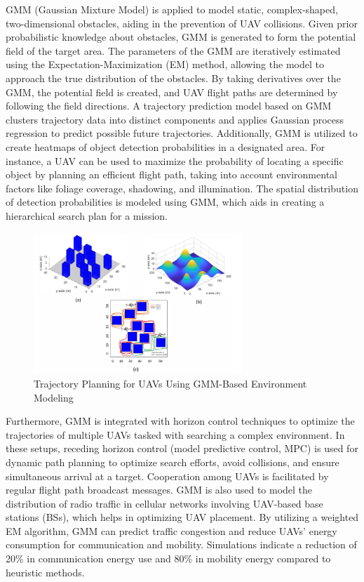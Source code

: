 GMM (Gaussian Mixture Model) is applied to model static, complex-shaped, two-dimensional obstacles, aiding in the prevention of UAV collisions. Given prior probabilistic knowledge about obstacles, GMM is generated to form the potential field of the target area. The parameters of the GMM are iteratively estimated using the Expectation-Maximization (EM) method, allowing the model to approach the true distribution of the obstacles. By taking derivatives over the GMM, the potential field is created, and UAV flight paths are determined by following the field directions. A trajectory prediction model based on GMM clusters trajectory data into distinct components and applies Gaussian process regression to predict possible future trajectories. Additionally, GMM is utilized to create heatmaps of object detection probabilities in a designated area. For instance, a UAV can be used to maximize the probability of locating a specific object by planning an efficient flight path, taking into account environmental factors like foliage coverage, shadowing, and illumination. The spatial distribution of detection probabilities is modeled using GMM, which aids in creating a hierarchical search plan for a mission. 


    \begin{figure}[H]
        \centering
        \includegraphics[width=0.7\textwidth]{Figures/Chapter2/Section1/9.png}
        \caption{Trajectory Planning for UAVs Using GMM-Based Environment Modeling~\cite{huang2021navigating}}
        \label{trajectory-planning-gmm}
    \end{figure}





Furthermore, GMM is integrated with horizon control techniques to optimize the trajectories of multiple UAVs tasked with searching a complex environment. In these setups, receding horizon control (model predictive control, MPC) is used for dynamic path planning to optimize search efforts, avoid collisions, and ensure simultaneous arrival at a target. Cooperation among UAVs is facilitated by regular flight path broadcast messages. GMM is also used to model the distribution of radio traffic in cellular networks involving UAV-based base stations (BSs), which helps in optimizing UAV placement. By utilizing a weighted EM algorithm, GMM can predict traffic congestion and reduce UAVs' energy consumption for communication and mobility. Simulations indicate a reduction of 20\% in communication energy use and 80\% in mobility energy compared to heuristic methods.

